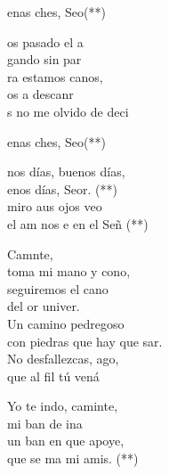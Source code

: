 \documentclass[12pt]{article}
\begin{document}
\begin{multicols*}{2}
\begin{cancion}%
	\begin{chorus}%
	enas ches, Seo(**)\\
	\end{chorus}%
	os pasado el a \\
	gando sin par\\
	ra estamos canos,\\
	os a descanr\\
	s no me olvido de deci\\
	\begin{chorus}%
	enas ches, Seo(**)\\
	\end{chorus}%
\end{cancion}%

\begin{cancion}%
	nos días, buenos días, \\
	enos días, Seor. (**)\\
	 miro aus ojos veo\\
	 el am nos e en el Señ (**) \\
\end{cancion}%

\begin{cancion}[Caminante][]%
	Camnte,\\
	toma mi mano y cono,\\
	seguiremos el cano\\
	del or univer.\\
Un camino pedregoso\\
	con piedras que hay que sar.\\
	No desfallezcas, ago,\\
	que al fil tú vená\\
	\begin{chorus}%
	Yo te indo, caminte,\\
	mi ban de ina\\
	un ban en que apoye, \\
	que se ma mi amis. (**)\\
	\end{chorus}%
\end{cancion}%


\end{multicols*}
\end{document}
